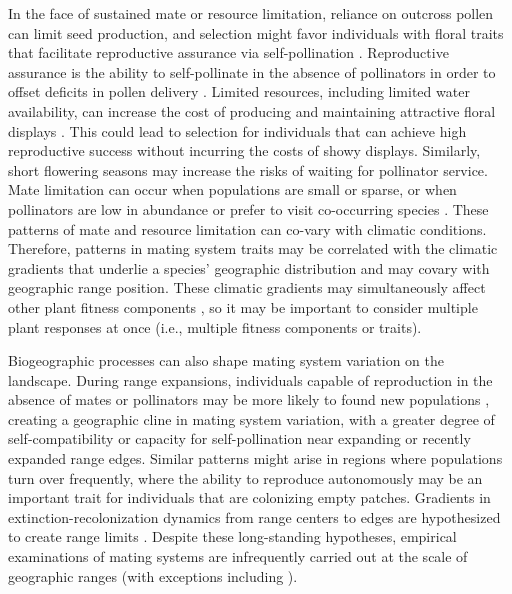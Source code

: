 \documentclass{article}
\begin{document}
In the face of sustained mate or resource limitation, reliance on outcross pollen can limit seed production, and selection might favor individuals with floral traits that facilitate reproductive assurance via self-pollination \citep{bodbyl2011rapid}. Reproductive assurance is the ability to self-pollinate in the absence of pollinators in order to offset deficits in pollen delivery \citep{jain1976evolution}. Limited resources, including limited water availability, can increase the cost of producing and maintaining attractive floral displays \citep{galen1999flowers}. This could lead to selection for individuals that can achieve high reproductive success without incurring the costs of showy displays. Similarly, short flowering seasons may increase the risks of waiting for pollinator service. Mate limitation can occur when populations are small or sparse, or when pollinators are low in abundance or prefer to visit co-occurring species \citep{knight2005pollen}. These patterns of mate and resource limitation can co-vary with climatic conditions. Therefore, patterns in mating system traits may be correlated with the climatic gradients that underlie a species' geographic distribution \citep{lennartsson2002extinction, moeller2005ecologicalcontext} and may covary with geographic range position. These climatic gradients may simultaneously affect other plant fitness components \citep{doak2010demographic}, so it may be important to consider multiple plant responses at once (i.e., multiple fitness components or traits).

Biogeographic processes can also shape mating system variation on the landscape. During range expansions, individuals capable of reproduction in the absence of mates or pollinators may be more likely to found new populations \citep{baker1955self, pannell2015scope}, creating a geographic cline in mating system variation, with a greater degree of self-compatibility or capacity for self-pollination near expanding or recently expanded range edges. Similar patterns might arise in regions where populations turn over frequently, where the ability to reproduce autonomously may be an important trait for individuals that are colonizing empty patches. Gradients in extinction-recolonization dynamics from range centers to edges are hypothesized to create range limits \citep{holt2000alternative}. Despite these long-standing hypotheses, empirical examinations of mating systems are infrequently carried out at the scale of geographic ranges (with exceptions including \citealt{busch2005evolution, herlihy2005evolution, moeller2005ecologicalcontext, dart2011broad, mimura2007adaptive}).
\end{document}

